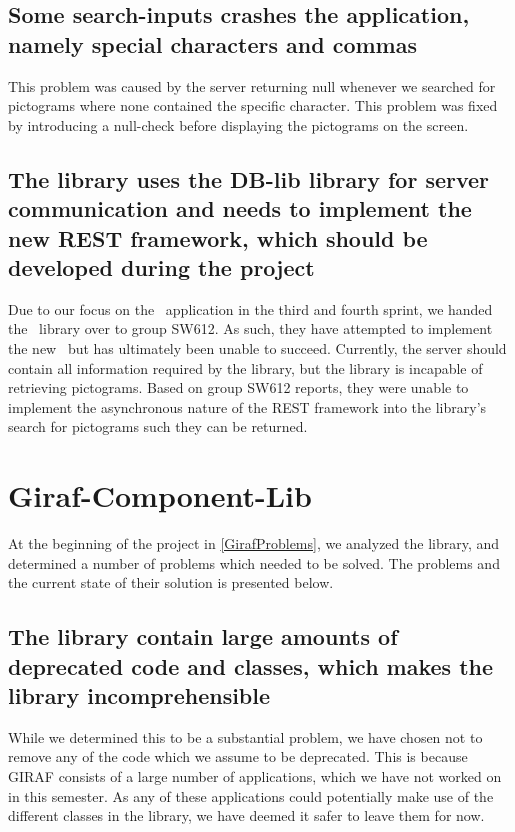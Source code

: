 \subsection*{Some search-inputs crashes the application, namely special
characters and commas} This problem was caused by the server returning null
whenever we searched for pictograms where none contained the specific character.
This problem was fixed by introducing a null-check before displaying the
pictograms on the screen.
  
  
\subsection*{The library uses the DB-lib library for server communication and
needs to implement the new REST framework, which should be developed during the
project} Due to our focus on the \lapp\ application in the third and fourth
sprint, we handed the \plib\ library over to group SW612. As such, they
have attempted to implement the new \rlib\ but has ultimately been
unable to succeed. Currently, the server should contain all information required
by the library, but the library is incapable of retrieving pictograms. Based on
group SW612 reports, they were unable to implement the asynchronous nature of
the REST framework into the library's search for pictograms such they can be
returned.

\section{Giraf-Component-Lib}
At the beginning of the project in \autoref{GirafProblems}, we analyzed the
 library, and determined a number of problems which
needed to be solved. The problems and the current state of their solution is presented
below.

\subsection*{The library contain large amounts of deprecated code and classes,
which makes the library incomprehensible} While we determined this to be a
substantial problem, we have chosen not to remove any of the code which we
assume to be deprecated. This is because GIRAF consists of a large number of
applications, which we have not worked on in this semester. As any of these
applications could potentially make use of the different classes in the library,
we have deemed it safer to leave them for now.

